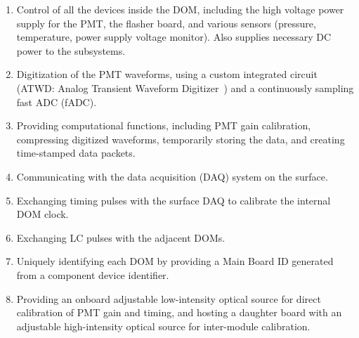 \begin{enumerate}
\item{Control of all the devices inside the DOM, including the high voltage power supply for the PMT, 
the flasher board, and various sensors (pressure, temperature, power supply voltage monitor). 
Also supplies necessary DC power to the subsystems.}
\item{Digitization of the PMT waveforms, using a custom integrated circuit (ATWD: Analog
  Transient Waveform Digitizer~\cite{ICECUBE:DAQ}) and a continuously sampling fast ADC (fADC).}
\item{Providing computational functions, including PMT gain calibration, compressing 
digitized waveforms, temporarily storing the data, and creating time-stamped data packets.}
\item{Communicating with the data acquisition (DAQ) system on the surface.}
\item{Exchanging timing pulses with the surface DAQ to calibrate the internal DOM clock. }
\item{Exchanging LC pulses with the adjacent DOMs.}
\item{Uniquely identifying each DOM by providing a Main Board ID generated from a 
component device identifier.}
\item{Providing an onboard adjustable low-intensity optical source
    for direct calibration of PMT gain and timing, and hosting a
    daughter board with an adjustable high-intensity optical source for inter-module calibration.}
\end{enumerate}

